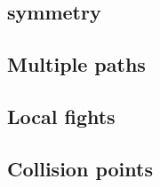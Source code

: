 \begin{figure}[ht]
\centering
{}
\label{fig:fpsmaps}
\caption[Overview of classic FPS maps(from the game Counterstrike:Source). The "Multiple paths" pattern is clearly visible.]{}
\end{figure}

\subsection{symmetry}

\subsection{Multiple paths}

\subsection{Local fights}

\subsection{Collision points}

